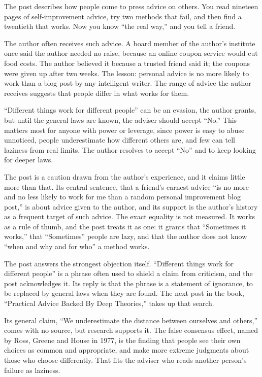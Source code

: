 \begin{afterword}
\summaryhead

The post describes how people come to press advice on others. You read nineteen pages of self-improvement advice, try two methods that fail, and then find a twentieth that works. Now you know ``the real way,'' and you tell a friend.

The author often receives such advice. A board member of the author's institute once said the author needed no raise, because an online coupon service would cut food costs. The author believed it because a trusted friend said it; the coupons were given up after two weeks. The lesson: personal advice is no more likely to work than a blog post by any intelligent writer. The range of advice the author receives suggests that people differ in what works for them.

``Different things work for different people'' can be an evasion, the author grants, but until the general laws are known, the adviser should accept ``No.'' This matters most for anyone with power or leverage, since power is easy to abuse unnoticed, people underestimate how different others are, and few can tell laziness from real limits. The author resolves to accept ``No'' and to keep looking for deeper laws.

\responsehead

The post is a caution drawn from the author's experience, and it claims little more than that. Its central sentence, that a friend's earnest advice ``is no more and no less likely to work for me than a random personal improvement blog post,'' is about advice given to the author, and its support is the author's history as a frequent target of such advice. The exact equality is not measured. It works as a rule of thumb, and the post treats it as one: it grants that ``Sometimes it works,'' that ``Sometimes'' people are lazy, and that the author does not know ``when and why and for who'' a method works.

The post answers the strongest objection itself. ``Different things work for different people'' is a phrase often used to shield a claim from criticism, and the post acknowledges it. Its reply is that the phrase is a statement of ignorance, to be replaced by general laws when they are found. The next post in the book, ``Practical Advice Backed By Deep Theories,'' takes up that search.

Its general claim, ``We underestimate the distance between ourselves and others,'' comes with no source, but research supports it. The false consensus effect, named by Ross, Greene and House in 1977, is the finding that people see their own choices as common and appropriate, and make more extreme judgments about those who choose differently. That fits the adviser who reads another person's failure as laziness.


\end{afterword}
